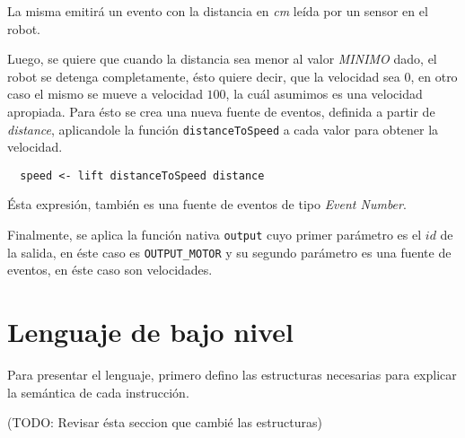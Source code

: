 La misma emitirá un evento con la distancia en \emph{cm} leída
por un sensor en el robot.

  Luego, se quiere que cuando la distancia sea menor al valor
\emph{MINIMO} dado, el robot se detenga completamente, ésto
quiere decir, que la velocidad sea $0$, en otro caso el mismo
se mueve a velocidad $100$, la cuál asumimos es una velocidad
apropiada.
  Para ésto se crea una nueva fuente de eventos, definida a partir
de \emph{distance}, aplicandole la función \texttt{distanceToSpeed} 
a cada valor para obtener la velocidad.

\begin{verbatim}
  speed <- lift distanceToSpeed distance
\end{verbatim}

  Ésta expresión, también es una fuente de eventos
de tipo \emph{Event Number}.

  Finalmente, se aplica la función nativa \texttt{output} cuyo
primer parámetro es el $id$ de la salida, en éste caso es \texttt{OUTPUT\_MOTOR}
y su segundo parámetro es una fuente de eventos,
en éste caso son velocidades.


\section{Lenguaje de bajo nivel}

 Para presentar el lenguaje, primero defino las estructuras
necesarias para explicar la semántica de cada instrucción.

(TODO: Revisar ésta seccion que cambié las estructuras)

